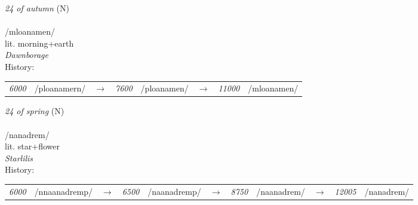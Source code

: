 \vspace{15pt}
\begin{nopagebreak}
 \textit{24 of autumn} (N)\\
\\
\noindent /mloan{\textprimstress}amen/\\
\noindent lit. morning+earth\\
\noindent \textit{Dawnborage}\\


\noindent History:

\vspace{-0pt}
\hspace{40pt}
\begin{tabular}{ccc}
\textit{6000} & /ploanamern/&$\rightarrow$ & \textit{7600} & /ploanamen/&$\rightarrow$ & \textit{11000} & /mloanamen/& \\
\end{tabular}

\vspace{20pt}\hline

\end{nopagebreak}
\filbreak



\vspace{15pt}
\begin{nopagebreak}
 \textit{24 of spring} (N)\\
\\
\noindent /nan{\textprimstress}adrem/\\
\noindent lit. star+flower\\
\noindent \textit{Starlilis}\\


\noindent History:

\vspace{-0pt}
\hspace{40pt}
\begin{tabular}{ccc}
\textit{6000} & /nnaanadremp/&$\rightarrow$ & \textit{6500} & /naanadremp/&$\rightarrow$ & \textit{8750} & /naanadrem/&$\rightarrow$ & \textit{12005} & /nanadrem/& \\
\end{tabular}

\vspace{20pt}\hline

\end{nopagebreak}
\filbreak



